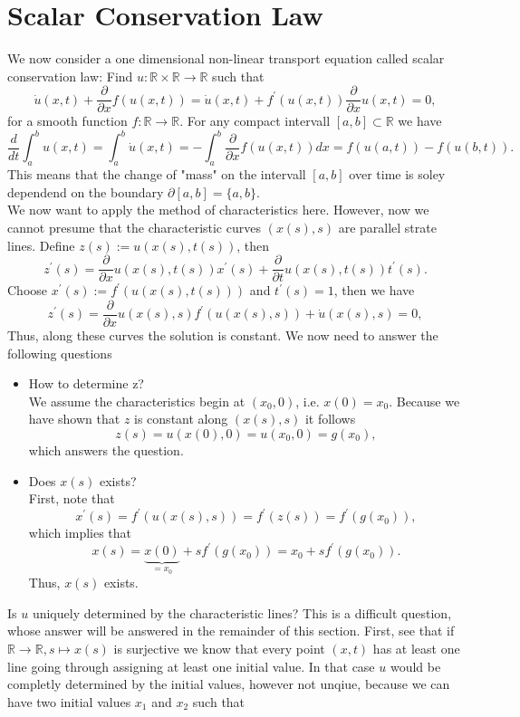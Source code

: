 \documentclass[A4,12pt,twoside]{book}
\begin{document}
\section{Scalar Conservation Law}
We now consider a one dimensional non-linear transport equation called scalar conservation law: Find $u: \mathbb{R} \times \mathbb{R} \to \mathbb{R}$ such that 
\[
\dot{u} (x,t) + \frac{\partial }{\partial x} f(u(x,t)) = \dot{u}(x,t) + f^\prime (u(x,t)) \frac{\partial}{\partial x} u(x,t) =0,
\]
for a smooth function $f: \mathbb{R} \to \mathbb{R}$. For any compact intervall $[a,b] \subset \mathbb{R}$ we have 
\[
\frac{d}{dt} \int_a^b u(x,t) = \int_a^b \dot{u} (x,t) = - \int_a^b \frac{\partial}{\partial x} f(u(x,t)) dx = f(u(a,t)) - f(u(b,t)).
\]
This means that the change of "mass" on the intervall $[a,b]$ over time is soley dependend on the boundary $\partial [a,b] = \{a,b\}$. \\
We now want to apply the method of characteristics here. However, now we cannot presume that the characteristic curves $(x(s),s)$ are parallel strate lines. Define $z(s) := u(x(s),t(s))$, then 
\[
z^\prime (s) = \frac{\partial}{\partial x} u(x(s) , t(s) ) x^\prime (s) + \frac{\partial}{\partial t} u(x(s),t(s)) t^\prime (s).
\] 
Choose $x^\prime (s) := f^\prime (u(x(s),t(s)))$ and $t^\prime (s)=1$, then we have 
\[
z^\prime (s) = \frac{\partial}{\partial x} u(x(s) , s ) f^\prime (u(x(s),s) ) + \dot{u}(x(s),s) =0 ,
\]
Thus, along these curves the solution is constant. We now need to answer the following questions 
\begin{itemize}
    \item How to determine z?\\
    We assume the characteristics begin at $(x_0,0)$, i.e. $x(0)=x_0$. Because we have shown that $z$ is constant along $(x(s),s)$ it follows 
    \[
    z(s) = u(x(0),0 ) = u(x_0,0) = g(x_0),
    \]
    which answers the question.
    \item Does $x(s)$ exists? \\
    First, note that 
    \[
    x^\prime (s) = f^\prime (u(x(s),s)) = f^\prime (z(s) ) = f^\prime (g(x_0)),
     \]
     which implies that 
     \[
     x(s) = \underbrace{x(0)}_{=x_0} + s f^\prime (g(x_0)) = x_0 + s f^\prime (g(x_0)) .
     \]
     Thus, $x(s)$ exists.
\end{itemize}
Is $u$ uniquely determined by the characteristic lines? This is a difficult question, whose answer will be answered in the remainder of this section. First, see that if $\mathbb{R} \to \mathbb{R}, s \mapsto x(s)$ is surjective we know that every point $(x,t)$ has at least one line going through assigning at least one initial value. In that case $u$ would be completly determined by the initial values, however not unqiue, because we can have two initial values $x_1$ and $x_2$ such that 
\end{document}
